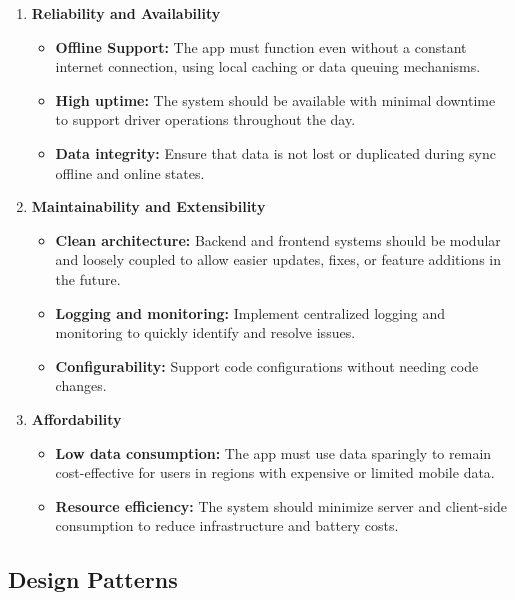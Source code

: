 \documentclass[a4paper,12pt]{article}
\begin{document}
\begin{enumerate}
    \item \textbf{Reliability and Availability}
    \begin{itemize}
        \item \textbf{Offline Support:} The app must function even without a constant internet connection, using local caching or data queuing mechanisms.
        \item \textbf{High uptime:} The system should be available with minimal downtime to support driver operations throughout the day.
        \item \textbf{Data integrity:} Ensure that data is not lost or duplicated during sync offline and online states.
    \end{itemize}

    \item \textbf{Maintainability and Extensibility}
    \begin{itemize}
        \item \textbf{Clean architecture:} Backend and frontend systems should be modular and loosely coupled to allow easier updates, fixes, or feature additions in the future.
        \item \textbf{Logging and monitoring:} Implement centralized logging and monitoring to quickly identify and resolve issues.
        \item \textbf{Configurability:} Support code configurations without needing code changes.
    \end{itemize}

    \item \textbf{Affordability}
    \begin{itemize}
        \item \textbf{Low data consumption:} The app must use data sparingly to remain cost-effective for users in regions with expensive or limited mobile data.
        \item \textbf{Resource efficiency:} The system should minimize server and client-side consumption to reduce infrastructure and battery costs.
    \end{itemize}
\end{enumerate}

\subsection{Design Patterns}
\end{document}
